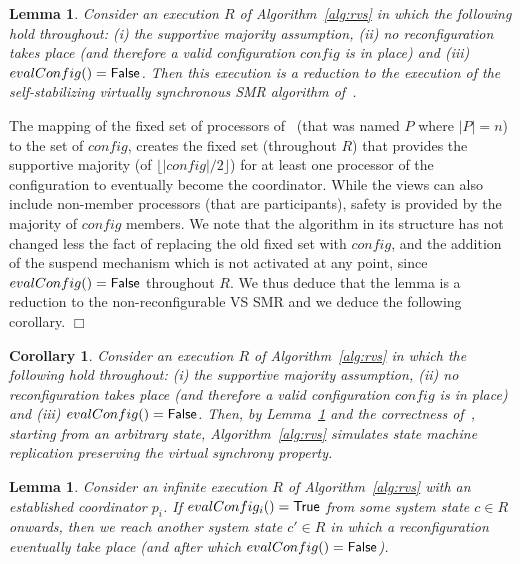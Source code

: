 \documentclass[11pt]{article}
\newtheorem{lemma}[theorem]{Lemma}
\newtheorem{corollary}[theorem]{Corollary}
\newenvironment{proof}{\noindent{\bf Proof.}}{\hfill$\Box$}
\begin{document}
\begin{lemma}
\label{thVS:reduction}
Consider an execution $R$ of Algorithm~\ref{alg:rvs} in which the following hold throughout: (i) the supportive majority assumption, (ii) no reconfiguration takes place (and therefore a valid configuration $config$ is in place) and (iii) $evalConfig()=\sf False$.
Then this execution is a reduction to the execution of the self-stabilizing virtually synchronous SMR algorithm 
of~\cite{SSVS}.
\end{lemma}

\begin{proof}
The mapping of the fixed set of processors of~\cite{SSVS} (that was named $P$ where $|P|=n$) to the set of $config$, creates the fixed set (throughout $R$) that provides the supportive majority (of $\lfloor |config|/2 \rfloor $) for at least one processor of the configuration to eventually become the coordinator. 
While the views can also include non-member processors (that are participants), safety is provided by the majority of $config$ members.
We note that the algorithm in its structure has not changed less the fact of replacing the old fixed set with $config$, and the addition of the suspend mechanism which is not activated at any point, since $evalConfig()=\sf False$ throughout $R$.
We thus deduce that the lemma is a reduction to the non-reconfigurable VS SMR and we deduce the following corollary.
\end{proof}

\begin{corollary}
\label{thVS:redCorollary}
Consider an execution $R$ of Algorithm~\ref{alg:rvs} in which the following hold throughout: (i) the supportive majority assumption, (ii) no reconfiguration takes place (and therefore a valid configuration $config$ is in place) and (iii) $evalConfig()=\sf False$. 
Then, by Lemma~\ref{thVS:reduction} and the correctness of~\cite{SSVS},  starting from an arbitrary state, Algorithm~\ref{alg:rvs} simulates state machine replication preserving the virtual synchrony property.
\end{corollary}

\begin{lemma}
\label{thVS:eventReconf} 
\sloppy Consider an infinite execution $R$ of Algorithm~\ref{alg:rvs} with an established coordinator $p_i$. 
If $evalConfig_i() = \sf True$ from some system state $c \in R$ onwards, then we reach another system state $c' \in R$ in which a reconfiguration eventually take place (and after which $evalConfig() = \sf False$). 
\end{lemma}
\end{document}
